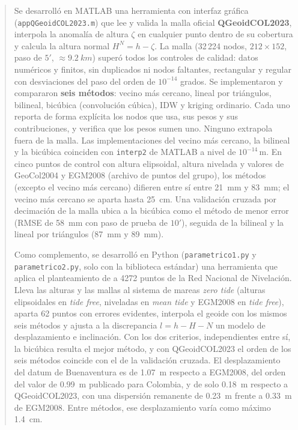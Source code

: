 \documentclass[11pt,letterpaper]{article}
\begin{document}
\begin{abstract}
\noindent
Se desarrolló en MATLAB una herramienta con interfaz gráfica
(\texttt{appQGeoidCOL2023.m}) que lee y valida la malla oficial \textbf{QGeoidCOL2023},
interpola la anomalía de altura $\zeta$ en cualquier punto dentro de su cobertura y
calcula la altura normal $H^N=h-\zeta$. La malla (32\,224 nodos, $212\times152$, paso
de $5'$, $\approx\SI{9.2}{km}$) superó todos los controles de calidad: datos numéricos y
finitos, sin duplicados ni nodos faltantes, rectangular y regular con desviaciones del
paso del orden de $10^{-14}$ grados. Se implementaron y compararon \textbf{seis métodos}:
vecino más cercano, lineal por triángulos, bilineal, bicúbica (convolución cúbica),
IDW y kriging ordinario. Cada uno reporta de forma explícita los nodos que usa, sus pesos y sus
contribuciones, y verifica que los pesos sumen uno. Ninguno extrapola fuera de la malla.
Las implementaciones del vecino más cercano, la bilineal y la bicúbica coinciden con
\texttt{interp2} de MATLAB a nivel de $10^{-14}$\,m. En cinco puntos de control con altura
elipsoidal, altura nivelada y valores de GeoCol2004 y EGM2008 (archivo de puntos del grupo),
los métodos (excepto el vecino más cercano) difieren entre sí entre \SI{21}{mm} y \SI{83}{mm}; el vecino más
cercano se aparta hasta \SI{25}{cm}. Una validación cruzada por decimación de la malla ubica a la
bicúbica como el método de menor error (RMSE de \SI{58}{mm} con paso de prueba de $10'$),
seguida de la bilineal y la lineal por triángulos (\SI{87}{mm} y \SI{89}{mm}).

Como complemento, se desarrolló en Python (\texttt{parametrico1.py} y \texttt{parametrico2.py},
solo con la biblioteca estándar) una herramienta que aplica el planteamiento de
\citet{guimaraes2025} a 4272 puntos de la Red Nacional de Nivelación. Lleva las alturas y las
mallas al sistema de mareas \emph{zero tide} (alturas elipsoidales en \emph{tide free}, niveladas en
\emph{mean tide} y EGM2008 en \emph{tide free}), aparta 62 puntos con errores evidentes,
interpola el geoide con los mismos seis métodos y ajusta a la discrepancia $l=h-H-N$ un modelo de
desplazamiento e inclinación. Con los dos criterios, independientes entre sí, la bicúbica resulta el
mejor método, y con QGeoidCOL2023 el orden de los seis métodos coincide con el de la validación
cruzada. El desplazamiento del datum de Buenaventura es de \SI{1.07}{m} respecto a EGM2008, del
orden del valor de \SI{0.99}{m} publicado para Colombia, y de solo \SI{0.18}{m} respecto a
QGeoidCOL2023, con una dispersión remanente de \SI{0.23}{m} frente a \SI{0.33}{m} de EGM2008.
Entre métodos, ese desplazamiento varía como máximo \SI{1.4}{cm}.


\end{abstract}
\end{document}
